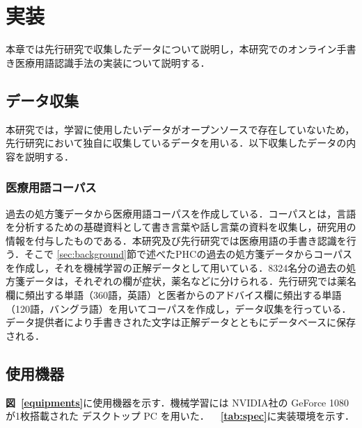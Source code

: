 
\chapter{実装}
\label{cha:imple}
本章では先行研究\cite{takahashi}で収集したデータについて説明し，本研究でのオンライン手書き医療用語認識手法の実装について説明する．
\section{データ収集}
\label{sec:collection}
本研究では，学習に使用したいデータがオープンソースで存在していないため，先行研究\cite{takahashi}において独自に収集しているデータを用いる．以下収集したデータの内容を説明する．

\subsection{医療用語コーパス}
\label{ssec:corpus}
過去の処方箋データから医療用語コーパスを作成している．コーパスとは，言語を分析するための基礎資料として書き言葉や話し言葉の資料を収集し，研究用の情報を付与したものである．本研究及び先行研究\cite{takahashi}では医療用語の手書き認識を行う．そこで \ref{sec:background}節で述べたPHCの過去の処方箋データからコーパスを作成し，それを機械学習の正解データとして用いている．8324名分の過去の処方箋データは，それぞれの欄が症状，薬名などに分けられる．先行研究\cite{takahashi}では薬名欄に頻出する単語（360語，英語）と医者からのアドバイス欄に頻出する単語（120語，バングラ語）を用いてコーパスを作成し，データ収集を行っている．データ提供者により手書きされた文字は正解データとともにデータベースに保存される．
%

\section{使用機器}
\label{sec:machine}
\textbf{図~\ref{equipments}}に使用機器を示す．機械学習には NVIDIA社の GeForce 1080 が1枚搭載された デスクトップ PC を用いた．\textbf{~\tablename~\ref{tab:spec}}に実装環境を示す．

